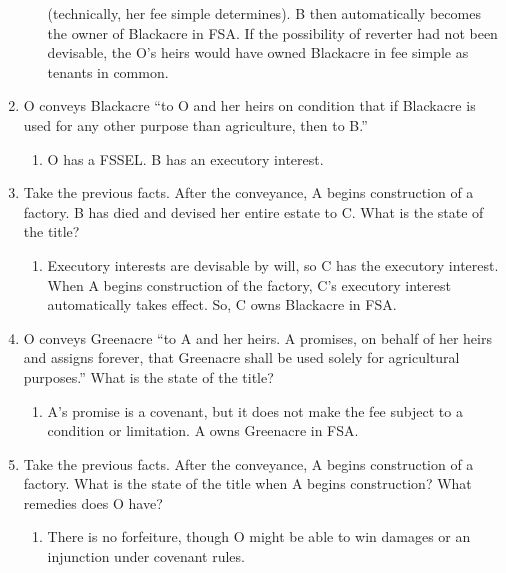 \begin{enumerate}
\begin{enumerate}
        (technically, her fee simple determines). B then automatically becomes 
        the owner of Blackacre in FSA. If the possibility of reverter had not 
        been devisable, the O's heirs would have owned Blackacre in fee simple 
        as tenants in common.
    \end{enumerate}
    \item O conveys Blackacre ``to O and her heirs on condition that if 
    Blackacre is used for any other purpose than agriculture, then to B.''
    \begin{enumerate}
        \item O has a FSSEL. B has an executory interest.
    \end{enumerate}
    \item Take the previous facts. After the conveyance, A begins construction 
    of a factory. B has died and devised her entire estate to C. What is the 
    state of the title?
    \begin{enumerate}
        \item Executory interests are devisable by will, so C has the 
        executory interest. When A begins construction of the factory, C's 
        executory interest automatically takes effect. So, C owns Blackacre in 
        FSA.
    \end{enumerate}
    \item O conveys Greenacre ``to A and her heirs. A promises, on behalf of 
    her heirs and assigns forever, that Greenacre shall be used solely for 
    agricultural purposes.'' What is the state of the title?
    \begin{enumerate}
        \item A's promise is a covenant, but it does not make the fee subject 
        to a condition or limitation. A owns Greenacre in FSA.
    \end{enumerate}
    \item Take the previous facts. After the conveyance, A begins construction 
    of a factory. What is the state of the title when A begins construction? 
    What remedies does O have?
    \begin{enumerate}
        \item There is no forfeiture, though O might be able to win damages or 
        an injunction under covenant rules.
    \end{enumerate}
\end{enumerate}
